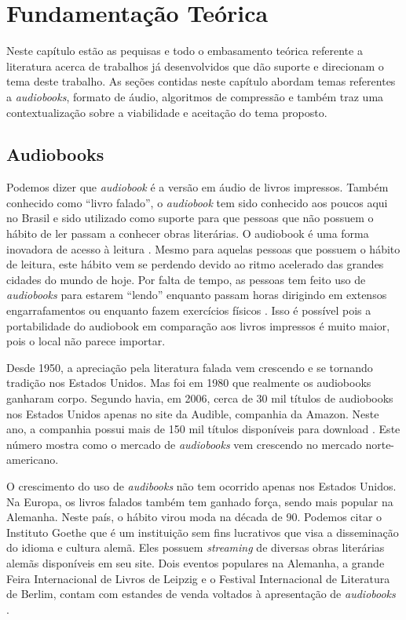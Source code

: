 \chapter[Fundamentação Teórica]{Fundamentação Teórica}\label{cap2}

Neste capítulo estão as pequisas e todo o embasamento teórica referente a literatura acerca de trabalhos já desenvolvidos que dão suporte e direcionam o tema deste trabalho. As seções contidas neste capítulo abordam temas referentes a \textit{audiobooks}, formato de áudio, algoritmos de compressão e também traz uma contextualização sobre a viabilidade e aceitação do tema proposto.

\section{Audiobooks}

Podemos dizer que \textit{audiobook} é a versão em áudio de livros impressos. Também conhecido como ``livro falado'', o \textit{audiobook} tem sido conhecido aos poucos aqui no Brasil e sido utilizado como suporte para que pessoas que não possuem o hábito de ler passam a conhecer obras literárias. O audiobook é uma forma inovadora de acesso à leitura \cite{audiobooksuporte}. Mesmo para aquelas pessoas que possuem o hábito de leitura, este hábito vem se perdendo devido ao ritmo acelerado das grandes cidades do mundo de hoje. Por falta de tempo, as pessoas tem feito uso de \textit{audiobooks} para estarem ``lendo'' enquanto passam horas dirigindo em extensos engarrafamentos ou enquanto fazem exercícios físicos \cite{audiobookinovacao}. Isso é possível pois a portabilidade do audiobook em comparação aos livros impressos é muito maior, pois o local não parece importar.

Desde 1950, a apreciação pela literatura falada vem crescendo e se tornando tradição nos Estados Unidos. Mas foi em 1980 que realmente os audiobooks ganharam corpo. Segundo \cite{teixeira} havia, em 2006, cerca de 30 mil títulos de audiobooks nos Estados Unidos apenas no site da Audible, companhia da Amazon. Neste ano, a companhia possui mais de 150 mil títulos disponíveis para download \cite{audible}. Este número mostra como o mercado de \textit{audiobooks} vem crescendo no mercado norte-americano.

O crescimento do uso de \textit{audibooks} não tem ocorrido apenas nos Estados Unidos. Na Europa, os livros falados também tem ganhado força, sendo mais popular na Alemanha. Neste país, o hábito virou moda na década de 90. Podemos citar o Instituto Goethe que é um instituição sem fins lucrativos que visa a disseminação do idioma e cultura alemã. Eles possuem \textit{streaming} de diversas obras literárias alemãs disponíveis em seu site. Dois eventos populares na Alemanha, a grande Feira Internacional de Livros de Leipzig e o Festival Internacional de Literatura de Berlim, contam com estandes de venda voltados à apresentação de \textit{audiobooks} \cite{dw}.

